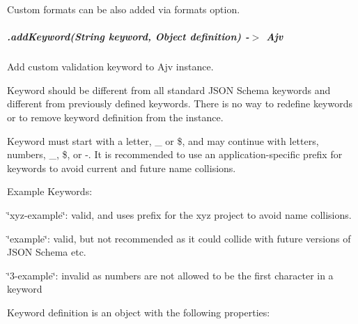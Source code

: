 Custom formats can be also added via {\ttfamily formats} option.

\subparagraph*{\label{_api-addkeyword}%
.add\+Keyword(\+String keyword, Object definition) -\/$>$ Ajv}

Add custom validation keyword to Ajv instance.

Keyword should be different from all standard J\+S\+ON Schema keywords and different from previously defined keywords. There is no way to redefine keywords or to remove keyword definition from the instance.

Keyword must start with a letter, {\ttfamily \+\_\+} or {\ttfamily \$}, and may continue with letters, numbers, {\ttfamily \+\_\+}, {\ttfamily \$}, or {\ttfamily -\/}. It is recommended to use an application-\/specific prefix for keywords to avoid current and future name collisions.

Example Keywords\+:
\begin{DoxyItemize}
\item {\ttfamily \char`\"{}xyz-\/example\char`\"{}}\+: valid, and uses prefix for the xyz project to avoid name collisions.
\item {\ttfamily \char`\"{}example\char`\"{}}\+: valid, but not recommended as it could collide with future versions of J\+S\+ON Schema etc.
\item {\ttfamily \char`\"{}3-\/example\char`\"{}}\+: invalid as numbers are not allowed to be the first character in a keyword
\end{DoxyItemize}

Keyword definition is an object with the following properties\+:


